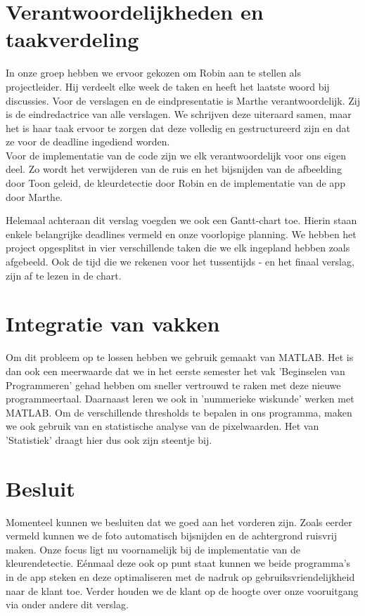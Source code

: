 \documentclass[a4paper,kulak]{kulakarticle}
\begin{document}
	\section{Verantwoordelijkheden en taakverdeling}		
		In onze groep hebben we ervoor gekozen om Robin aan te stellen als projectleider. Hij verdeelt elke week de taken en heeft het laatste woord bij discussies. 
		Voor de verslagen en de eindpresentatie is Marthe verantwoordelijk. Zij is de eindredactrice van alle verslagen. We schrijven deze uiteraard samen, maar het is haar taak ervoor te zorgen dat deze volledig en gestructureerd zijn en dat ze voor de deadline ingediend worden.\\
		Voor de implementatie van de code zijn we elk verantwoordelijk voor ons eigen deel. Zo wordt het verwijderen van de ruis en het bijsnijden van de afbeelding door Toon geleid, de kleurdetectie door Robin en de implementatie van de app door Marthe.
		
		Helemaal achteraan dit verslag voegden we ook een Gantt-chart toe. Hierin staan enkele belangrijke deadlines vermeld en onze voorlopige planning. We hebben het project opgesplitst in vier verschillende taken die we elk ingepland hebben zoals afgebeeld. Ook de tijd die we rekenen voor het tussentijds - en het finaal verslag, zijn af te lezen in de chart.
		
	\section{Integratie van vakken}
		Om dit probleem op te lossen hebben we gebruik gemaakt van MATLAB. Het is dan ook een meerwaarde dat we in het eerste semester het vak 'Beginselen van Programmeren' gehad hebben om sneller vertrouwd te raken met deze nieuwe programmeertaal. Daarnaast leren we ook in 'nummerieke wiskunde' werken met MATLAB. Om de verschillende thresholds te bepalen in ons programma, maken we ook gebruik van en statistische analyse van de pixelwaarden. Het van 'Statistiek' draagt hier dus ook zijn steentje bij.
	
	\section{Besluit}	
		Momenteel kunnen we besluiten dat we goed aan het vorderen zijn. Zoals eerder vermeld kunnen we de foto automatisch bijsnijden en de achtergrond ruisvrij maken. Onze focus ligt nu voornamelijk bij de implementatie van de kleurendetectie. Eénmaal deze ook op punt staat kunnen we beide programma's in de app steken en deze optimaliseren met de nadruk op gebruiksvriendelijkheid naar de klant toe. Verder houden we de klant op de hoogte over onze vooruitgang via onder andere dit verslag. 
	\newpage		
	
\end{document}
